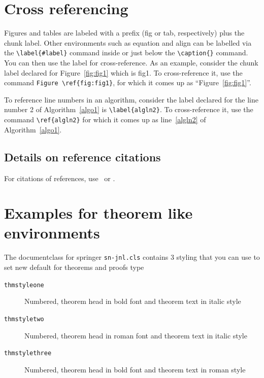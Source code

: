 \documentclass[sn-basic,pdflatex]{sn-jnl}
\theoremstyle{remark}
\theoremstyle{definition}
\begin{document}
\hypertarget{sec8}{%
\section{Cross referencing}\label{sec8}}

Figures and tables are labeled with a prefix (fig or tab, respectively)
plus the chunk label. Other environments such as equation and align can
be labelled via the \texttt{\textbackslash{}label\{\#label\}} command
inside or just below the \texttt{\textbackslash{}caption\{\}} command.
You can then use the label for cross-reference. As an example, consider
the chunk label declared for Figure~\ref{fig:fig1} which is fig1. To
cross-reference it, use the command
\texttt{Figure\ \textbackslash{}ref\{fig:fig1\}}, for which it comes up
as ``Figure~\ref{fig:fig1}''.

To reference line numbers in an algorithm, consider the label declared
for the line number 2 of Algorithm~\ref{algo1} is
\texttt{\textbackslash{}label\{algln2\}}. To cross-reference it, use the
command \texttt{\textbackslash{}ref\{algln2\}} for which it comes up as
line~\ref{algln2} of Algorithm~\ref{algo1}.

\hypertarget{subsec7}{%
\subsection{Details on reference citations}\label{subsec7}}

For citations of references, use~\citet{bib1} or \citep{bib2}.

\hypertarget{sec10}{%
\section{Examples for theorem like environments}\label{sec10}}

The documentclass for springer \texttt{sn-jnl.cls} contains 3 styling
that you can use to set new default for theorems and proofs type

\begin{description}
\item[\texttt{thmstyleone}]
Numbered, theorem head in bold font and theorem text in italic style
\item[\texttt{thmstyletwo}]
Numbered, theorem head in roman font and theorem text in italic style
\item[\texttt{thmstylethree}]
Numbered, theorem head in bold font and theorem text in roman style
\end{description}
\end{document}
